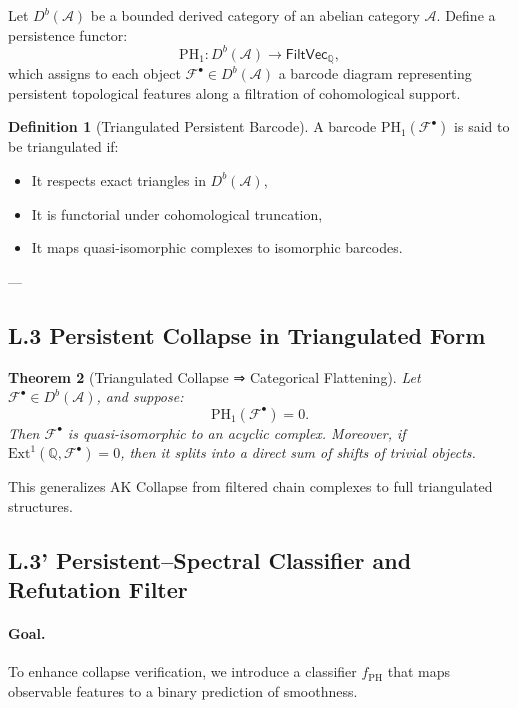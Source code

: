 \documentclass[11pt]{article}
\newtheorem{theorem}{Theorem}[section]
\theoremstyle{definition}
\newtheorem{definition}[theorem]{Definition}
\begin{document}
Let \( D^b(\mathcal{A}) \) be a bounded derived category of an abelian category \( \mathcal{A} \).  
Define a persistence functor:
\[
\mathrm{PH}_1: D^b(\mathcal{A}) \longrightarrow \mathsf{FiltVec}_\mathbb{Q},
\]
which assigns to each object \( \mathcal{F}^\bullet \in D^b(\mathcal{A}) \) a barcode diagram representing persistent topological features along a filtration of cohomological support.

\begin{definition}[Triangulated Persistent Barcode]
A barcode \( \mathrm{PH}_1(\mathcal{F}^\bullet) \) is said to be triangulated if:
\begin{itemize}
  \item It respects exact triangles in \( D^b(\mathcal{A}) \),
  \item It is functorial under cohomological truncation,
  \item It maps quasi-isomorphic complexes to isomorphic barcodes.
\end{itemize}
\end{definition}

---

\subsection*{L.3 Persistent Collapse in Triangulated Form}

\begin{theorem}[Triangulated Collapse ⇒ Categorical Flattening]
Let \( \mathcal{F}^\bullet \in D^b(\mathcal{A}) \), and suppose:
\[
\mathrm{PH}_1(\mathcal{F}^\bullet) = 0.
\]
Then \( \mathcal{F}^\bullet \) is quasi-isomorphic to an acyclic complex.  
Moreover, if \( \mathrm{Ext}^1(\mathbb{Q}, \mathcal{F}^\bullet) = 0 \), then it splits into a direct sum of shifts of trivial objects.
\end{theorem}

This generalizes AK Collapse from filtered chain complexes to full triangulated structures.

\subsection*{L.3' Persistent–Spectral Classifier and Refutation Filter}

\paragraph{Goal.}
To enhance collapse verification, we introduce a classifier $f_{\mathrm{PH}}$ that maps observable features to a binary prediction of smoothness.
\end{document}
